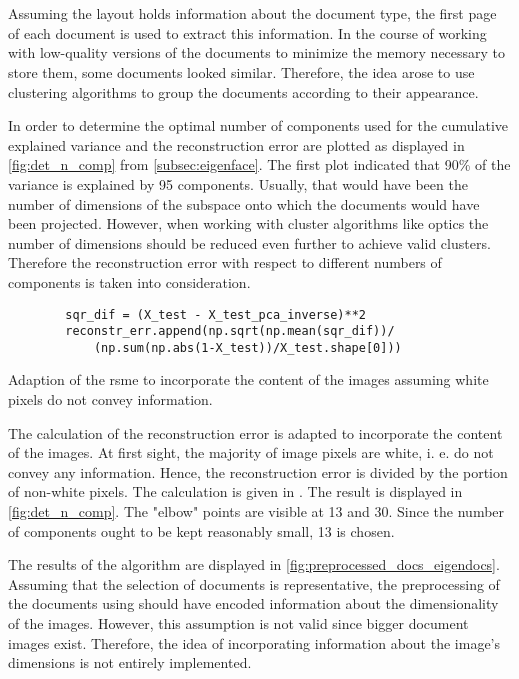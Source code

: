 \section{\eigendocs{}}\label{sec:evaluation-eigendocs}
Assuming the layout holds information about the document type, the first page of each document is used to extract this information.
In the course of working with low-quality versions of the documents to minimize the memory necessary to store them, some documents looked similar.
Therefore, the idea arose to use clustering algorithms to group the documents according to their appearance.

In order to determine the optimal number of components used for \eigendocs{} the cumulative explained variance and the reconstruction error are plotted 
as displayed in \autoref{fig:det_n_comp} from \autoref{subsec:eigenface}.
The first plot indicated that 90\% of the variance is explained by 95 components.
Usually, that would have been the number of dimensions of the subspace onto which the documents would have been projected.
However, when working with cluster algorithms like \ac{optics} the number of dimensions should be reduced even further to achieve valid clusters.
Therefore the reconstruction error with respect to different numbers of components is taken into consideration.

\begin{listing}[htp]
    \begin{verbatim}
        sqr_dif = (X_test - X_test_pca_inverse)**2
        reconstr_err.append(np.sqrt(np.mean(sqr_dif))/
            (np.sum(np.abs(1-X_test))/X_test.shape[0])) 
    \end{verbatim}
    \caption[Adaption of the \ac{rsme}]{
        Adaption of the \ac{rsme} to incorporate the content of the images assuming white pixels do not convey information.
    }
    \label{lst:impl-weighted-rsme}
\end{listing}

The calculation of the reconstruction error is adapted to incorporate the content of the images.
At first sight, the majority of image pixels are white, i. e. do not convey any information.
Hence, the reconstruction error is divided by the portion of non-white pixels. 
The calculation is given in .
The result is displayed in \autoref{fig:det_n_comp}.
The "elbow" points are visible at 13 and 30.
Since the number of components ought to be kept reasonably small, 13 is chosen.


The results of the \eigendocs{} algorithm are displayed in \autoref{fig:preprocessed_docs_eigendocs}.
Assuming that the selection of documents is representative, 
the preprocessing of the documents using \eigendocs{} should have encoded information about the dimensionality of the images.
However, this assumption is not valid since bigger document images exist.
Therefore, the idea of incorporating information about the image's dimensions is not entirely implemented.